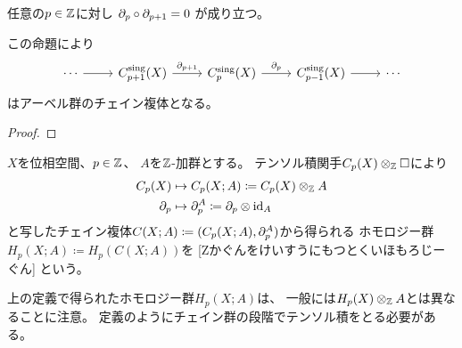 \documentclass[report]{jlreq}
\begin{document}
\begin{proposition}
    任意の$p \in \mathbb{Z}$に対し
    $\partial_p \circ \partial_{p + 1} = 0$
    が成り立つ。
\end{proposition}

\begin{remark}
    この命題により
    \begin{equation}
        \begin{tikzcd}
            \cdots \ar{r}
            & C^\sing_{p + 1}(X) \ar{r}{\partial_{p + 1}}
            & C^\sing_p(X) \ar{r}{\partial_{p}}
            & C^\sing_{p - 1}(X) \ar{r}
            & \cdots
        \end{tikzcd}
    \end{equation}
    はアーベル群のチェイン複体となる。
\end{remark}

\begin{proof}
    \TODO{}
\end{proof}

\begin{definition}[連続写像から誘導されるチェイン写像]
\end{definition}

\begin{definition}[特異ホモロジー群]
    \TODO{}
\end{definition}

\begin{definition}[$\Z$-加群を係数にもつ特異ホモロジー群]
    $X$を位相空間、$p \in \mathbb{Z}$、
    $A$を$\Z$-加群とする。
    テンソル積関手$C_p(X) \otimes_{\mathbb{Z}} \Box$により
    \begin{alignat}{1}
        C_p(X) &\mapsto C_p(X; A) \coloneqq C_p(X) \otimes_{\mathbb{Z}} A \\
        \partial_p &\mapsto \partial^A_p \coloneqq \partial_p \otimes \mathrm{id}_A
    \end{alignat}
    と写したチェイン複体$C(X; A) \coloneqq (C_p(X; A), \partial^A_p)$から得られる
    ホモロジー群$H_p(X; A) \coloneqq H_p(C(X; A))$を
    [Zかぐんをけいすうにもつとくいほもろじーぐん]
    という。
\end{definition}

\begin{remark}
    上の定義で得られたホモロジー群$H_p(X; A)$は、
    一般には$H_p(X) \otimes_{\mathbb{Z}} A$とは異なることに注意。
    定義のようにチェイン群の段階でテンソル積をとる必要がある。

\end{remark}
\end{document}
